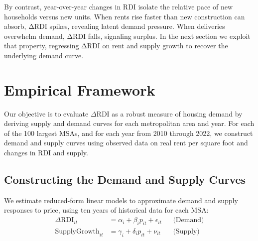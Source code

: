 \documentclass[APA,Times1COL]{WileyNJDv5} %
\begin{document}
By contrast, year-over-year changes in RDI isolate the relative pace of new households versus new units. When rents rise faster than new construction can absorb, ΔRDI spikes, revealing latent demand pressure. When deliveries overwhelm demand, ΔRDI falls, signaling surplus. In the next section we exploit that property, regressing ΔRDI on rent and supply growth to recover the underlying demand curve.

\section{Empirical Framework}
Our objective is to evaluate \( \Delta \text{RDI} \) as a robust measure of housing demand by deriving supply and demand curves for each metropolitan area and year. For each of the 100 largest MSAs, and for each year from 2010 through 2022, we construct demand and supply curves using observed data on real rent per square foot and changes in RDI and supply.

\subsection{Constructing the Demand and Supply Curves}

We estimate reduced-form linear models to approximate demand and supply responses to price, using ten years of historical data for each MSA:
\begin{align*}
	\Delta \text{RDI}_{it} &= \alpha_i + \beta_i p_{it} + \epsilon_{it} && \text{(Demand)} \\
	\text{SupplyGrowth}_{it} &= \gamma_i + \delta_i p_{it} + \nu_{it} && \text{(Supply)}
\end{align*}
\end{document}
